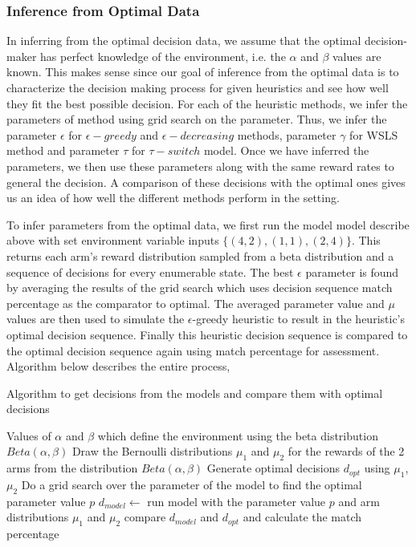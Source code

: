 \subsubsection{Inference from Optimal Data}
In inferring from the optimal decision data, we assume that the optimal decision-maker has perfect knowledge of the environment, i.e. the $\alpha$ and $\beta$ values are known. This makes sense since our goal of inference from the optimal data is to characterize the decision making process for given heuristics and see how well they fit the best possible decision. For each of the heuristic methods, we infer the parameters of method using grid search on the parameter. Thus, we infer the parameter $\epsilon$ for $\epsilon-greedy$ and $\epsilon-decreasing$ methods, parameter $\gamma$ for WSLS method and parameter $\tau$ for $\tau-switch$ model. Once we have inferred the parameters, we then use these parameters along with the same reward rates to general the decision. A comparison of these decisions with the optimal ones gives us an idea of how well the different methods perform in the setting. 

To infer parameters from the optimal data, we first run the model model describe above with set environment variable inputs $\{(4,2), (1,1), (2,4)\}$. This returns each arm's reward distribution sampled from a beta distribution and a sequence of decisions for every enumerable state. The best $\epsilon$ parameter is found by averaging the results of the grid search which uses decision sequence match percentage as the comparator to optimal. The averaged parameter value and $\mu$ values are then used to simulate the $\epsilon$-greedy heuristic to result in the heuristic's optimal decision sequence. Finally this heuristic decision sequence is compared to the optimal decision sequence again using match percentage for assessment.
Algorithm below describes the entire process,
\begin{algorithm}[H]
\caption{Algorithm to get decisions from the models and compare them with optimal decisions}
\label{algoOptimalModelComparison}
\renewcommand{\algorithmicrequire}{\textbf{Input:}}
\renewcommand{\algorithmicensure}{\textbf{Output:}}
\begin{algorithmic}[1]
		\REQUIRE Values of $\alpha$ and $\beta$ which define the environment using the beta distribution $Beta(\alpha,\beta)$
	\STATE Draw the Bernoulli distributions $\mu_1$ and $\mu_2$ for the rewards of the 2 arms from the distribution $Beta(\alpha,\beta)$
	\STATE Generate optimal decisions $d_{opt}$ using $\mu_1$, $\mu_2$
			\STATE Do a grid search over the parameter of the model to find the optimal parameter value $p$
			\STATE $d_{model} \leftarrow $ run model with the parameter value $p$ and arm distributions $\mu_1$ and $\mu_2$
			\STATE compare $d_{model}$ and $d_{opt}$ and calculate the match percentage
		\ENDFOR
\end{algorithmic}
\end{algorithm}

